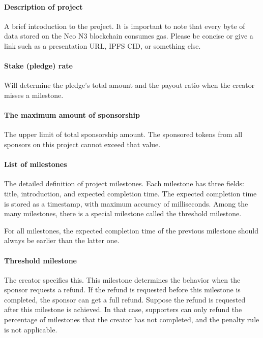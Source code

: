 \documentclass[12pt,a4paper]{article}
\begin{document}
    \paragraph{Description of project}

    A brief introduction to the project.
    It is important to note that every byte of data stored on the Neo N3 blockchain
    consumes gas.
    Please be concise or give a link such as a presentation URL, IPFS CID, or
    something else.

    \paragraph{Stake (pledge) rate}

    Will determine the pledge's total amount and the payout ratio when the
    creator misses a milestone.

    \paragraph{The maximum amount of sponsorship}

    The upper limit of total sponsorship amount.
    The sponsored tokens from all sponsors on this project cannot exceed that value.

    \paragraph{List of milestones}

    The detailed definition of project milestones.
    Each milestone has three fields: title, introduction, and expected completion
    time.
    The expected completion time is stored as a timestamp, with maximum accuracy
    of milliseconds.
    Among the many milestones, there is a special milestone called the threshold
    milestone.

    For all milestones, the expected completion time of the previous milestone
    should always be earlier than the latter one.

    \paragraph{Threshold milestone}

    The creator specifies this.
    This milestone determines the behavior when the sponsor requests a refund.
    If the refund is requested before this milestone is completed, the sponsor
    can get a full refund.
    Suppose the refund is requested after this milestone is achieved.
    In that case, supporters can only refund the percentage of milestones that
    the creator has not completed, and the penalty rule is not applicable.
\end{document}
